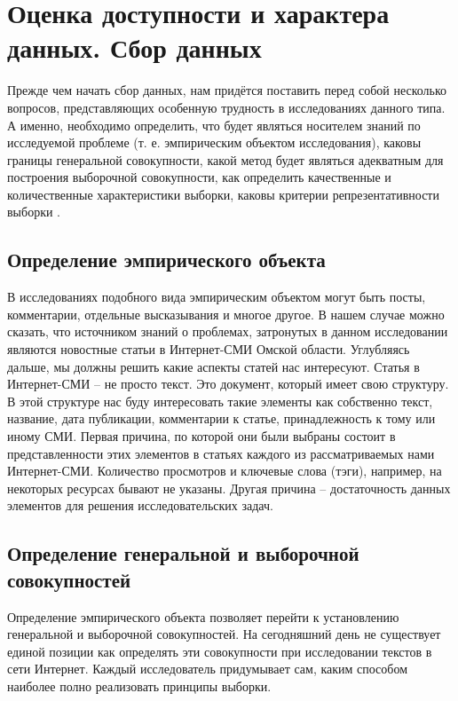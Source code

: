 \section{Оценка доступности и характера данных. Сбор данных}
Прежде чем начать сбор данных, нам придётся поставить перед собой несколько вопросов, представляющих особенную трудность в исследованиях данного типа. А именно, необходимо определить, что будет являться носителем знаний по исследуемой проблеме (т. е. эмпирическим объектом исследования), каковы границы генеральной совокупности, какой метод будет являться адекватным для построения выборочной совокупности, как определить качественные и количественные характеристики выборки, каковы критерии репрезентативности выборки \cite{methodlogy_internet}.

\subsection{Определение эмпирического объекта} 

В исследованиях подобного вида эмпирическим объектом могут быть посты, комментарии, отдельные высказывания и многое другое. В нашем случае можно сказать, что источником знаний о проблемах, затронутых в данном исследовании являются новостные статьи в Интернет-СМИ Омской области. Углубляясь дальше, мы должны решить какие аспекты статей нас интересуют. Статья в Интернет-СМИ -- не просто текст. Это документ, который имеет свою структуру. В этой структуре нас буду интересовать такие элементы как собственно текст, название, дата публикации, комментарии к статье, принадлежность к тому или иному СМИ. Первая причина, по которой они были выбраны состоит в представленности этих элементов в статьях каждого из рассматриваемых нами Интернет-СМИ. Количество просмотров и ключевые слова (тэги), например, на некоторых ресурсах бывают не указаны. Другая причина -- достаточность данных элементов для решения исследовательских задач.

\subsection{Определение генеральной и выборочной совокупностей}

Определение эмпирического объекта позволяет перейти к установлению генеральной и выборочной совокупностей. На сегодняшний день не существует единой позиции как определять эти совокупности при исследовании текстов в сети Интернет. Каждый исследователь придумывает сам, каким способом наиболее полно реализовать принципы выборки.

